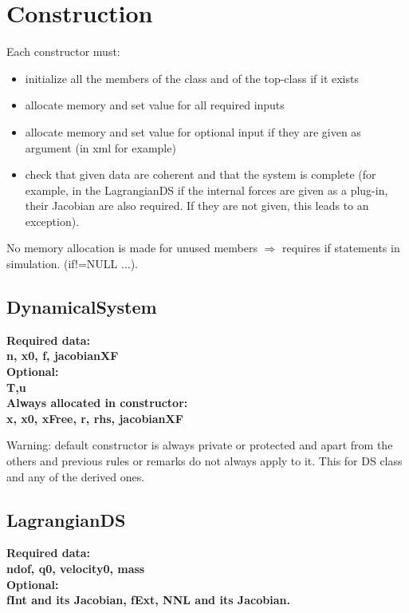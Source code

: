 \documentclass[10pt]{report}
\begin{document}
\section{Construction}

Each constructor must:
\begin{itemize}
\item initialize all the members of the class and of the top-class if it exists
\item allocate memory and set value for all required inputs
\item allocate memory and set value for optional input if they are given as argument (in xml for example)
\item check that given data are coherent and that the system is complete (for example, in the LagrangianDS
if the internal forces are given as a plug-in, their Jacobian are also required. If they are not given, this leads to an exception).
\end{itemize}

No memory allocation is made for unused members $\Rightarrow$ requires if statements in simulation.  (if!=NULL ...).\\

\subsection{DynamicalSystem}

\bf{Required data:}\\
n, x0, f, jacobianXF \\
\bf{Optional:}\\
T,u \\

\bf{Always allocated in constructor:} \\
x, x0, xFree, r, rhs, jacobianXF

Warning: default constructor is always private or protected and apart from the others and previous rules or remarks do not always apply to it. 
This for DS class and any of the derived ones. 

\subsection{LagrangianDS}

\bf{Required data:}\\
ndof, q0, velocity0, mass \\
\bf{Optional:}\\
fInt and its Jacobian, fExt, NNL and its Jacobian. \\
\end{document}
